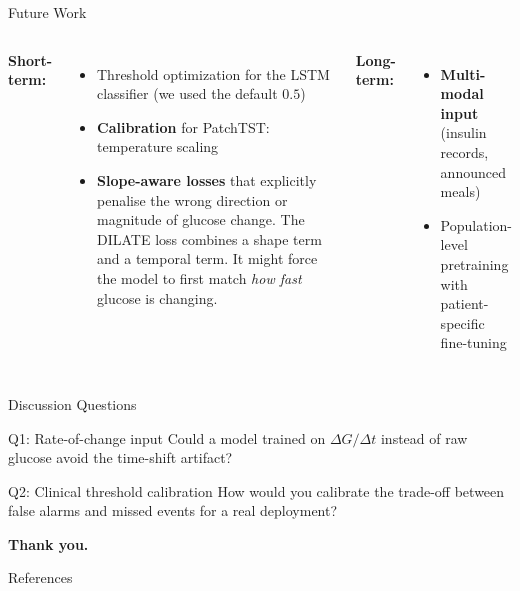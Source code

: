 \begin{frame}[t,shrink=7]{Future Work}
  \begin{columns}[T]
    \textbf{Short-term:}
    \begin{itemize}
      \item Threshold optimization for the LSTM classifier (we used the default $0.5$)
      \item \textbf{Calibration} for PatchTST: temperature scaling \cite{guo2017calibration}
      \item \textbf{Slope-aware losses} that explicitly penalise the wrong direction or magnitude of glucose change. The DILATE loss \cite{leguen2019dilate} combines a shape term and a temporal term. It might force the model to first match \emph{how fast} glucose is changing.
    \end{itemize}

    \textbf{Long-term:}
    \begin{itemize}
      \item \textbf{Multi-modal input} (insulin records, announced meals)
      \item Population-level pretraining with patient-specific fine-tuning
    \end{itemize}
  \end{columns}
\end{frame}

\begin{frame}[t]{Discussion Questions}
  \begin{block}{Q1: Rate-of-change input}
    Could a model trained on $\Delta G/\Delta t$ instead of raw glucose avoid the time-shift artifact?
  \end{block}
  \vspace{12pt}
  \begin{block}{Q2: Clinical threshold calibration}
    How would you calibrate the trade-off between false alarms and missed events for a real deployment?
  \end{block}
  \vspace{18pt}
  \centering\large\textbf{Thank you.}
\end{frame}

\begin{frame}[t,allowframebreaks]{References}
  \printbibliography[heading=none]
\end{frame}


